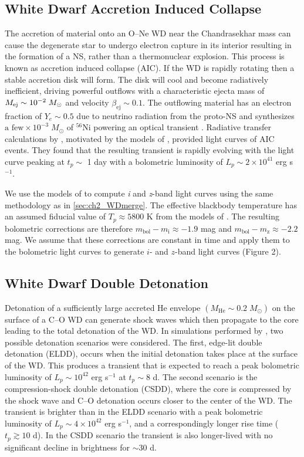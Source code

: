 \subsection{White Dwarf Accretion Induced Collapse}
\label{sec:AIC}
The accretion of material onto an O--Ne WD near the Chandrasekhar mass can cause the degenerate star to undergo electron capture in its interior resulting in the formation of a NS, rather than a thermonuclear explosion. This process is known as accretion induced collapse (AIC). If the WD is rapidly rotating then a stable accretion disk will form. The disk will cool and become radiatively inefficient, driving powerful outflows with a characteristic ejecta mass of $M_{\rm ej} \sim 10^{-2}\;M_{\odot}$ and velocity $\beta_{\text{ej}} \sim 0.1$. The outflowing material has an electron fraction of $Y_e \sim 0.5$ due to neutrino radiation from the proto-NS and synthesizes $\text{a few} \times 10^{-3}\; M_{\odot}$ of ${}^{56}$Ni powering an optical transient \citep{Metzger+09b}. Radiative transfer calculations by \citet{Darbha+10}, motivated by the models of \citet{Metzger+09b}, provided light curves of AIC events. They found that the resulting transient is rapidly evolving with the light curve peaking at $t_p \sim$ 1 day with a bolometric luminosity of $L_p \sim 2\times10^{41}$ erg s$^{-1}$.

We use the models of \citet{Darbha+10} to compute \emph{i} and \emph{z}-band light curves using the same methodology as in \autoref{sec:ch2_WDmerge}. The effective blackbody temperature has an assumed fiducial value of $T_p \approx 5800$ K from the models of \citet[see their Figure 3]{Darbha+10}. The resulting bolometric corrections are therefore $m_{\text{bol}} - m_{\text{i}} \approx -1.9$ mag and $m_{\text{bol}} - m_{\text{z}} \approx -2.2$ mag. We assume that these corrections are constant in time and apply them to the bolometric light curves to generate $i$- and $z$-band light curves (Figure 2).

\subsection{White Dwarf Double Detonation}
\label{sec:ch2_ELDD}
Detonation of a sufficiently large accreted He envelope $(M_{\text{He}} \sim 0.2\; M_{\odot})$ on the surface of a C--O WD can generate shock waves which then propagate to the core leading to the total detonation of the WD. In simulations performed by \citet{Sim+12}, two possible detonation scenarios were considered. The first, edge-lit double detonation (ELDD), occurs when the initial detonation takes place at the surface of the WD. This produces a transient that is expected to reach a peak bolometric luminosity of $L_p \sim 10^{42}$ erg s$^{-1}$ at $t_p \sim 8$ d. The second scenario is the compression-shock double detonation (CSDD), where the core is compressed by the shock wave and C--O detonation occurs closer to the center of the WD. The transient is brighter than in the ELDD scenario with a peak bolometric luminosity of $L _p \sim 4\times10^{42}$ erg s$^{-1}$, and a correspondingly longer rise time ($t_p  \gtrsim 10$ d). In the CSDD scenario the transient is also longer-lived with no significant decline in brightness for $\sim 30$ d.

